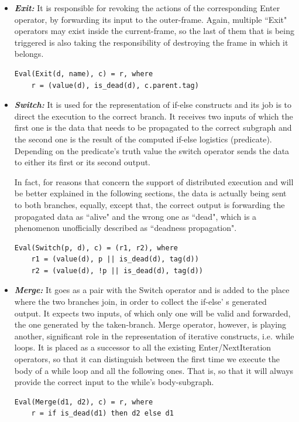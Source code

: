 \documentclass[ack,preface]{dithesis}
\begin{document}
\begin{itemize}
    \item \textit{\textbf{Exit:}} It  is responsible for revoking the actions of the corresponding Enter operator, by forwarding its input to the outer-frame.
 Again, multiple ``Exit" operators may exist inside the current-frame, so the last of them that is being triggered is also taking the responsibility of destroying the frame in which it belongs.
\begin{lstlisting}
Eval(Exit(d, name), c) = r, where
	r = (value(d), is_dead(d), c.parent.tag)
\end{lstlisting}

    \item \textit{\textbf{Switch:}} It is used for the representation of if-else constructs and its job is to direct the execution to the correct branch. It receives two inputs of which the first one is the data that needs to be propagated to the correct subgraph and the second one is the result of the computed if-else logistics  (predicate). Depending on the predicate's truth value the switch operator sends the data to either its first or its second output. 

In fact, for reasons that concern the support of distributed execution and will be better explained in the following sections,  the data is actually being sent to both branches, equally, 
except that, the correct output is forwarding the propagated data as ``alive" and the wrong one as ``dead", which is a phenomenon unofficially described as ``deadness propagation".
\begin{lstlisting}
Eval(Switch(p, d), c) = (r1, r2), where
	r1 = (value(d), p || is_dead(d), tag(d))
	r2 = (value(d), !p || is_dead(d), tag(d))
\end{lstlisting}


    \item \textit{\textbf{Merge:}} It goes as a pair with the Switch operator and is added to the place where the two branches join, in order to collect the if-else' s generated output. It expects two inputs, of which only one will be valid and forwarded, the one generated by the taken-branch. Merge operator, however, is playing another, significant role in the representation of iterative constructs, i.e. while loops. It is placed as a successor to all the existing Enter/NextIteration operators, so that it can distinguish between the first time we execute the body of a while loop and all the following ones. That is, so that  it will always provide the correct input to the while's body-subgraph. 
\begin{lstlisting}
Eval(Merge(d1, d2), c) = r, where
	r = if is_dead(d1) then d2 else d1
\end{lstlisting}

    \end{itemize}
\end{document}
